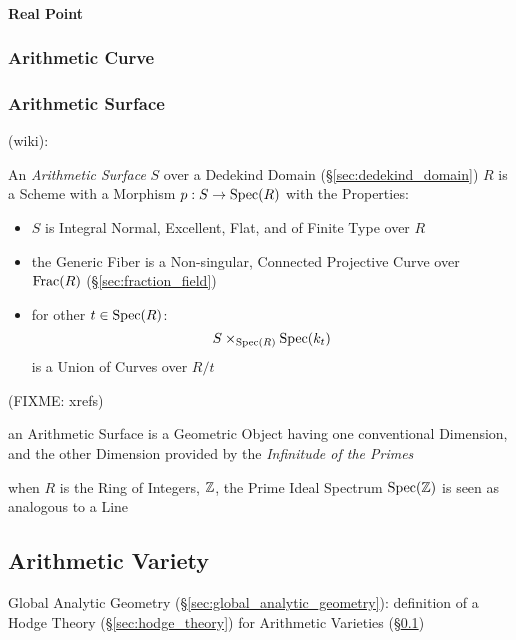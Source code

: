 \paragraph{Real Point}\label{sec:real_point}\hfill



\subsubsection{Arithmetic Curve}\label{sec:arithmetic_curve}


\subsubsection{Arithmetic Surface}\label{sec:arithmetic_surface}

(wiki):

An \emph{Arithmetic Surface} $S$ over a Dedekind Domain
(\S\ref{sec:dedekind_domain}) $R$ is a Scheme with a Morphism $p : S \rightarrow
\mathrm{Spec}(R)$ with the Properties:
\begin{itemize}
  \item $S$ is Integral Normal, Excellent, Flat, and of Finite Type over $R$
  \item the Generic Fiber is a Non-singular, Connected Projective Curve over
    $\mathrm{Frac}(R)$ (\S\ref{sec:fraction_field})
  \item for other $t \in \mathrm{Spec}(R)$:
    \[
      S \times_{\mathrm{Spec}(R)} \mathrm{Spec}(k_t)
    \]
    is a Union of Curves over $R / t$
\end{itemize}
(FIXME: xrefs)

an Arithmetic Surface is a Geometric Object having one conventional Dimension,
and the other Dimension provided by the \emph{Infinitude of the Primes}

when $R$ is the Ring of Integers, $\mathbb{Z}$, the Prime Ideal Spectrum
$\mathrm{Spec}(\mathbb{Z})$ is seen as analogous to a Line



\subsection{Arithmetic Variety}\label{sec:arithmetic_variety}

Global Analytic Geometry (\S\ref{sec:global_analytic_geometry}): definition of
a Hodge Theory (\S\ref{sec:hodge_theory}) for Arithmetic Varieties
(\S\ref{sec:arithmetic_variety})



